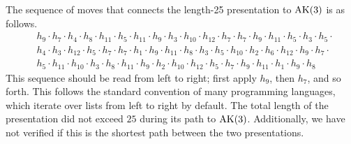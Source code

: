 The sequence of moves that connects the length-25 presentation to $\text{AK}(3)$ is as follows. 
\[
\begin{aligned}
& h_9 \cdot h_7 \cdot h_4 \cdot h_8 \cdot h_{11} \cdot h_5 \cdot h_{11} \cdot h_9 \cdot h_3 \cdot h_{10} \cdot h_{12} \cdot h_7 \cdot h_7 \cdot h_9 \cdot h_{11} \cdot h_5 \cdot h_3 \cdot h_5 \cdot \\
& h_4 \cdot h_3 \cdot h_{12} \cdot h_5 \cdot h_7 \cdot h_7 \cdot h_1 \cdot h_9 \cdot h_{11} \cdot h_8 \cdot h_3 \cdot h_5 \cdot h_{10} \cdot h_2 \cdot h_6 \cdot h_{12} \cdot h_9 \cdot h_7 \cdot \\
& h_5 \cdot h_{11} \cdot h_{10} \cdot h_3 \cdot h_8 \cdot h_{11} \cdot h_9 \cdot h_2 \cdot h_{10} \cdot h_{12} \cdot h_5 \cdot h_7 \cdot h_9 \cdot h_{11} \cdot h_1 \cdot h_9 \cdot h_8
\end{aligned}
\]
This sequence should be read from left to right; first apply $h_9$, then $h_7$, and so forth. This follows the standard convention of many programming languages, which iterate over lists from left to right by default. The total length of the presentation did not exceed $25$ during its path to $\text{AK}(3)$. Additionally, we have not verified if this is the shortest path between the two presentations.




